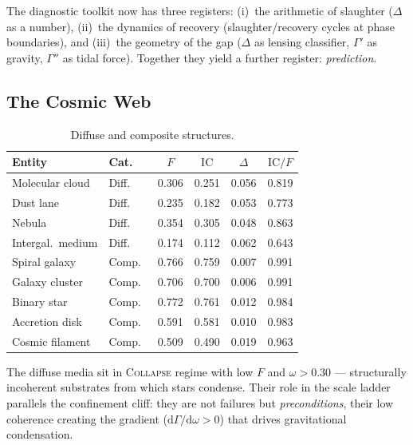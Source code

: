 \documentclass[
  aps,
  prd,
  twocolumn,
  superscriptaddress,
  nofootinbib,
  floatfix
]{revtex4-2}
\newcommand{\Gam}{\Gamma}
\newcommand{\dd}{\mathrm{d}}
\newcommand{\regime}[1]{\textrm{\upshape\scshape#1}}
\newcommand{\IC}{\mathrm{IC}}
\begin{document}
The diagnostic toolkit now has three registers:
(i)~the arithmetic of slaughter ($\Delta$ as a number),
(ii)~the dynamics of recovery (slaughter/recovery cycles at
phase boundaries), and (iii)~the geometry of the gap ($\Delta$
as lensing classifier, $\Gam'$ as gravity, $\Gam''$ as tidal
force).  Together they yield a further register:
\emph{prediction}.


\subsection{The Cosmic Web}

\begin{table}[htbp]
\caption{\label{tab:cosmic}Diffuse and composite structures.}
\begin{ruledtabular}
\begin{tabular}{llcccc}
Entity & Cat.\ & $F$ & $\IC$ & $\Delta$ & $\IC/F$ \\
\hline
Molecular cloud    & Diff.\ & 0.306 & 0.251 & 0.056 & 0.819 \\
Dust lane          & Diff.\ & 0.235 & 0.182 & 0.053 & 0.773 \\
Nebula             & Diff.\ & 0.354 & 0.305 & 0.048 & 0.863 \\
Intergal.\ medium  & Diff.\ & 0.174 & 0.112 & 0.062 & 0.643 \\
\hline
Spiral galaxy      & Comp.\ & 0.766 & 0.759 & 0.007 & 0.991 \\
Galaxy cluster     & Comp.\ & 0.706 & 0.700 & 0.006 & 0.991 \\
Binary star        & Comp.\ & 0.772 & 0.761 & 0.012 & 0.984 \\
Accretion disk     & Comp.\ & 0.591 & 0.581 & 0.010 & 0.983 \\
Cosmic filament    & Comp.\ & 0.509 & 0.490 & 0.019 & 0.963 \\
\end{tabular}
\end{ruledtabular}
\end{table}

The diffuse media sit in \regime{Collapse} regime with
low $F$ and $\omega > 0.30$ --- structurally incoherent
substrates from which stars condense.  Their role in the
scale ladder parallels the confinement cliff: they are
not failures but \emph{preconditions}, their low coherence
creating the gradient ($\dd\Gam/\dd\omega > 0$) that drives
gravitational condensation.
\end{document}
